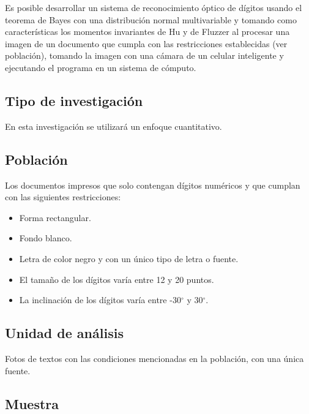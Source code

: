 \documentclass[a4paper, 11pt, oneside]{report}
\begin{document}
Es posible desarrollar un sistema de reconocimiento óptico de dígitos usando el teorema de Bayes con una distribución normal multivariable y tomando como características los momentos invariantes de Hu y de Fluzzer al procesar una imagen de un documento que cumpla con las restricciones establecidas (ver población), tomando la imagen con una cámara de un celular inteligente y ejecutando el programa en un sistema de cómputo.
	
\subsection{Tipo de investigación}

En esta investigación se utilizará un enfoque cuantitativo.

\subsection{Población}
\label{sect:population}

Los documentos impresos que solo contengan dígitos numéricos y que cumplan con las siguientes restricciones:

\begin{itemize}

	\item Forma rectangular.

	\item Fondo blanco.

	\item Letra de color negro y con un único tipo de letra o fuente.

	\item El tamaño de los dígitos varía entre 12 y 20 puntos.

	\item La inclinación de los dígitos varía entre -30$^{\circ}$ y 30$^{\circ}$.

\end{itemize}

\subsection{Unidad de análisis}

Fotos de textos con las condiciones mencionadas en la población, con una única fuente.

\subsection{Muestra}
\end{document}
